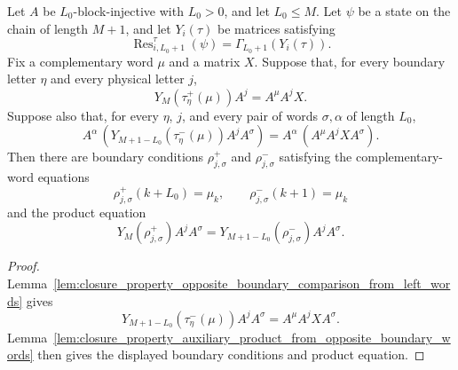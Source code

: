 \begin{lemma}
    \label{lem:closure_property_auxiliary_product_from_opposite_boundary_left_words}
    \leanok
    Let $A$ be $L_0$-block-injective with $L_0>0$, and let $L_0\le M$.
    Let $\psi$ be a state on the chain of length $M+1$, and let
    $Y_i(\tau)$ be matrices satisfying
    \[
        \operatorname{Res}^{\tau}_{i,L_0+1}(\psi)
        =
        \Gamma_{L_0+1}(Y_i(\tau)).
    \]
    Fix a complementary word $\mu$ and a matrix $X$. Suppose that, for every
    boundary letter $\eta$ and every physical letter $j$,
    \[
        Y_M(\tau^+_\eta(\mu))A^j=A^\mu A^jX .
    \]
    Suppose also that, for every $\eta$, $j$, and every pair of words
    $\sigma,\alpha$ of length $L_0$,
    \[
        A^\alpha\,
        \left(Y_{M+1-L_0}(\tau^-_\eta(\mu))A^jA^\sigma\right)
        =
        A^\alpha\,\left(A^\mu A^jXA^\sigma\right).
    \]
    Then there are boundary conditions $\rho^+_{j,\sigma}$ and
    $\rho^-_{j,\sigma}$ satisfying the complementary-word equations
    \[
        \rho^+_{j,\sigma}(k+L_0)=\mu_k,
        \qquad
        \rho^-_{j,\sigma}(k+1)=\mu_k
    \]
    and the product equation
    \[
        Y_M(\rho^+_{j,\sigma})A^jA^\sigma
        =
        Y_{M+1-L_0}(\rho^-_{j,\sigma})A^jA^\sigma .
    \]
\end{lemma}

\begin{proof}
    \leanok
    Lemma~\ref{lem:closure_property_opposite_boundary_comparison_from_left_words}
    gives
    \[
        Y_{M+1-L_0}(\tau^-_\eta(\mu))A^jA^\sigma
        =
        A^\mu A^jXA^\sigma .
    \]
    Lemma~\ref{lem:closure_property_auxiliary_product_from_opposite_boundary_words}
    then gives the displayed boundary conditions and product equation.
\end{proof}

